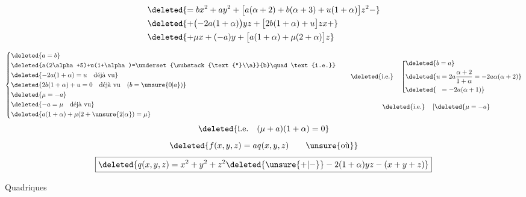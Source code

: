 \[
\begin{aligned}
&\deleted{=bx^2+ay^2+\bigl[a(\alpha+2)+b(\alpha+3)+u(1+\alpha)\bigr]z^2-}\\
&\deleted{+\bigl(-2a(1+\alpha)\bigr)yz+\bigl[2b(1+\alpha)+u\bigr]zx+}\\
&\deleted{+\mu x+(-a)y+\bigl[a(1+\alpha)+\mu(2+\alpha)\bigr]z}
\end{aligned}
\]

\[
\left\{\begin{aligned}
&\deleted{a=b}\\
&\deleted{a(2\alpha+5)+u(1+\alpha)=\underset{\substack{\text{''}\\a}}{b}\quad\text{i.e.}}\\
&\deleted{-2a(1+\alpha)=u\quad\text{déjà vu}}\\
&\deleted{2b(1+\alpha)+u=0\quad\text{déjà vu}\quad(b=\unsure{0|a})}\\
&\deleted{\mu=-a}\\
&\deleted{-a=\mu\quad\text{déjà vu}}\\
&\deleted{a(1+\alpha)+\mu(2+\unsure{2|\alpha})=\mu}
\end{aligned}\right.
\qquad
\begin{gathered}
\deleted{\text{i.e.}}\quad
\left[\begin{aligned}
&\deleted{b=a}\\
&\deleted{u=2a\frac{\alpha+2}{1+\alpha}=-2a\alpha(\alpha+2)}\\
&\deleted{\hphantom{u}=-2a(\alpha+1)}
\end{aligned}\right.\\[1em]
\deleted{\text{i.e.}}\quad\left[\deleted{\mu=-a}\right.
\end{gathered}
\]
\[
\deleted{\text{i.e.}\quad(\mu+a)(1+\alpha)=0}
\]
\[
\deleted{f(x,y,z)=aq(x,y,z)\qquad\text{\unsure{où}}}
\]
\[
\boxed{\deleted{q(x,y,z)=x^2+y^2+z^2\deleted{\unsure{+|-}}-2(1+\alpha)yz-(x+y+z)}}
\]


Quadriques 

